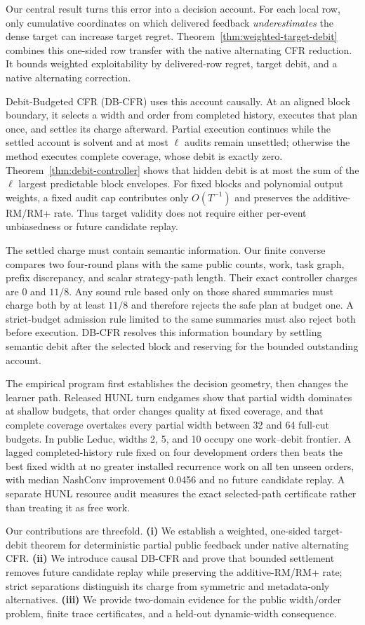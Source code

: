 Our central result turns this error into a decision account.  For each local
row, only cumulative coordinates on which delivered feedback
\emph{underestimates} the dense target can increase target regret.
Theorem~\ref{thm:weighted-target-debit} combines this one-sided row transfer
with the native alternating CFR reduction.  It bounds weighted exploitability
by delivered-row regret, target debit, and a native alternating correction.

Debit-Budgeted CFR (DB-CFR) uses this account causally.  At an aligned block
boundary, it selects a width and order from completed history, executes that
plan once, and settles its charge afterward.  Partial execution continues
while the settled account is solvent and at most $\ell$ audits remain
unsettled; otherwise the method executes complete coverage, whose debit is
exactly zero.  Theorem~\ref{thm:debit-controller} shows that hidden debit is at
most the sum of the $\ell$ largest predictable block envelopes.  For fixed
blocks and polynomial output weights, a fixed audit cap contributes only
$O(T^{-1})$ and preserves the additive-RM/RM+ rate.  Thus target validity does
not require either per-event unbiasedness or future candidate replay.

The settled charge must contain semantic information.  Our finite converse compares
two four-round plans with the same public counts, work, task graph, prefix
discrepancy, and scalar strategy-path length.  Their exact controller charges
are $0$ and $11/8$.  Any sound rule based only on those shared summaries must
charge both by at least $11/8$ and therefore rejects the safe plan at budget
one.  A strict-budget admission rule limited to the same summaries must also
reject both before execution.  DB-CFR resolves this information boundary by
settling semantic debit after the selected block and reserving for the bounded
outstanding account.

The empirical program first establishes the decision geometry, then changes
the learner path.  Released HUNL turn endgames show that partial width dominates
at shallow budgets, that order changes quality at fixed coverage, and that
complete coverage overtakes every partial width between 32 and 64 full-cut
budgets.  In public Leduc, widths 2, 5, and 10 occupy one work--debit frontier.
A lagged completed-history rule fixed on four development orders then beats the
best fixed width at no greater installed recurrence work on all ten unseen
orders, with median NashConv improvement 0.0456 and no future candidate
replay.  A separate HUNL resource audit measures the exact selected-path
certificate rather than treating it as free work.

Our contributions are threefold.  \textbf{(i)} We establish a weighted,
one-sided target-debit theorem for deterministic partial public feedback under
native alternating CFR.  \textbf{(ii)} We introduce causal DB-CFR and prove
that bounded settlement removes future candidate replay while preserving the
additive-RM/RM+ rate; strict separations distinguish its charge from symmetric
and metadata-only alternatives.  \textbf{(iii)} We provide two-domain
evidence for the public width/order problem, finite trace certificates, and a
held-out dynamic-width consequence.

